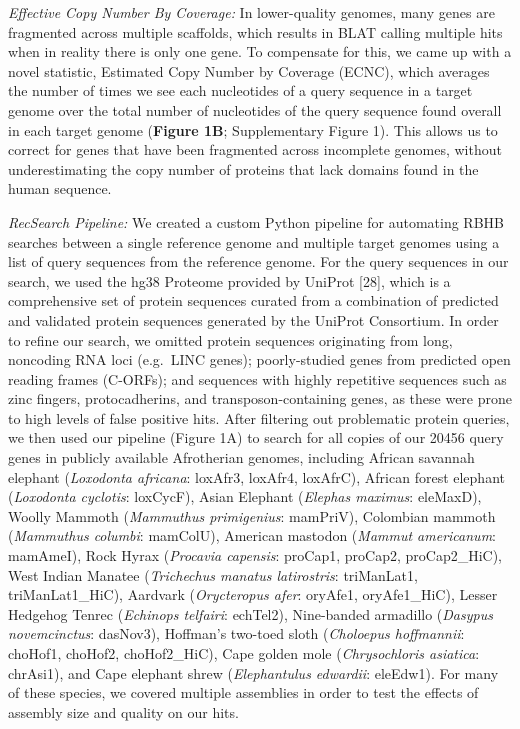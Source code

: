 \documentclass[10pt,letterpaper]{article}
\begin{document}
\emph{Effective Copy Number By Coverage:} In lower-quality genomes, many
genes are fragmented across multiple scaffolds, which results in BLAT
calling multiple hits when in reality there is only one gene. To
compensate for this, we came up with a novel statistic, Estimated Copy
Number by Coverage (ECNC), which averages the number of times we see
each nucleotides of a query sequence in a target genome over the total
number of nucleotides of the query sequence found overall in each target
genome (\textbf{Figure 1B}; Supplementary Figure 1). This allows us to
correct for genes that have been fragmented across incomplete genomes,
without underestimating the copy number of proteins that lack domains
found in the human sequence.

\emph{RecSearch Pipeline:} We created a custom Python pipeline for
automating RBHB searches between a single reference genome and multiple
target genomes using a list of query sequences from the reference
genome. For the query sequences in our search, we used the hg38 Proteome
provided by UniProt {[}28{]}, which is a comprehensive set of protein
sequences curated from a combination of predicted and validated protein
sequences generated by the UniProt Consortium. In order to refine our
search, we omitted protein sequences originating from long, noncoding
RNA loci (e.g.~LINC genes); poorly-studied genes from predicted open
reading frames (C-ORFs); and sequences with highly repetitive sequences
such as zinc fingers, protocadherins, and transposon-containing genes,
as these were prone to high levels of false positive hits. After
filtering out problematic protein queries, we then used our pipeline
(Figure 1A) to search for all copies of our 20456 query genes in
publicly available Afrotherian genomes, including African savannah
elephant (\emph{Loxodonta africana}: loxAfr3, loxAfr4, loxAfrC), African
forest elephant (\emph{Loxodonta cyclotis}: loxCycF), Asian Elephant
(\emph{Elephas maximus}: eleMaxD), Woolly Mammoth (\emph{Mammuthus
primigenius}: mamPriV), Colombian mammoth (\emph{Mammuthus columbi}:
mamColU), American mastodon (\emph{Mammut americanum}: mamAmeI), Rock
Hyrax (\emph{Procavia capensis}: proCap1, proCap2, proCap2\_HiC), West
Indian Manatee (\emph{Trichechus manatus latirostris}: triManLat1,
triManLat1\_HiC), Aardvark (\emph{Orycteropus afer}: oryAfe1,
oryAfe1\_HiC), Lesser Hedgehog Tenrec (\emph{Echinops telfairi}:
echTel2), Nine-banded armadillo (\emph{Dasypus novemcinctus}: dasNov3),
Hoffman's two-toed sloth (\emph{Choloepus hoffmannii}: choHof1, choHof2,
choHof2\_HiC), Cape golden mole (\emph{Chrysochloris asiatica}:
chrAsi1), and Cape elephant shrew (\emph{Elephantulus edwardii}:
eleEdw1). For many of these species, we covered multiple assemblies in
order to test the effects of assembly size and quality on our hits.
\end{document}
